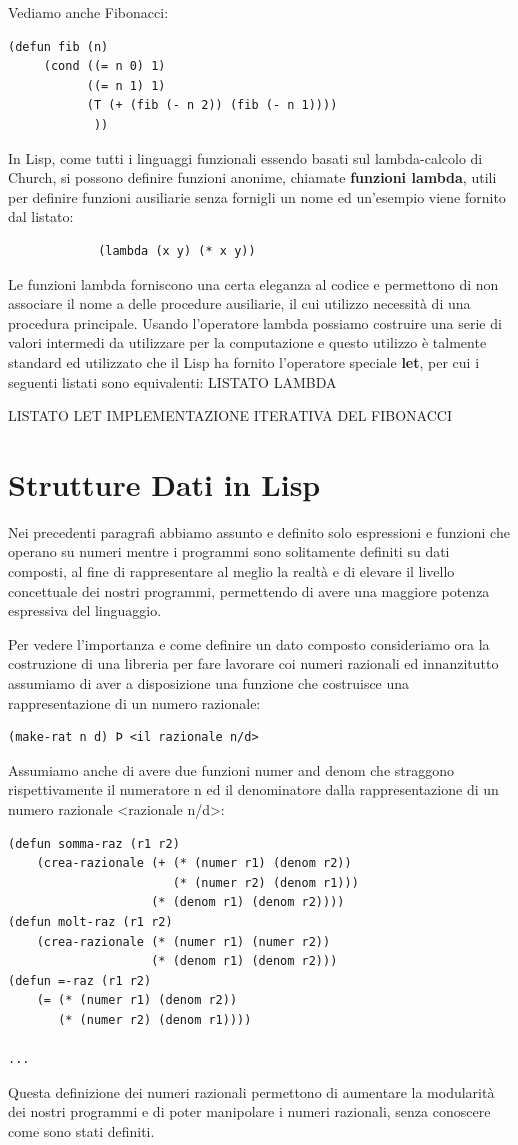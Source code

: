 \documentclass[a4paper]{book}
\begin{document}
Vediamo anche Fibonacci:
\begin{verbatim}
(defun fib (n)
     (cond ((= n 0) 1)
           ((= n 1) 1)
           (T (+ (fib (- n 2)) (fib (- n 1))))
            ))
\end{verbatim}
In Lisp, come tutti i linguaggi funzionali essendo basati sul lambda-calcolo di Church,
si possono definire funzioni anonime, chiamate \textbf{funzioni lambda}, utili per
definire funzioni ausiliarie senza fornigli un nome ed un'esempio viene fornito dal listato:
\begin{figure}
\begin{verbatim}
       (lambda (x y) (* x y))
\end{verbatim}
\end{figure}
Le funzioni lambda forniscono una certa eleganza al codice e permettono di non associare
il nome a delle procedure ausiliarie, il cui utilizzo necessità di una procedura principale.
Usando l'operatore lambda possiamo costruire una serie di valori intermedi da
utilizzare per la computazione e questo utilizzo è talmente standard ed utilizzato
che il Lisp ha fornito l'operatore speciale \textbf{let}, per cui i seguenti listati
sono equivalenti:
LISTATO LAMBDA

LISTATO LET
IMPLEMENTAZIONE ITERATIVA DEL FIBONACCI
\section{Strutture Dati in Lisp}
Nei precedenti paragrafi abbiamo assunto e definito solo espressioni e funzioni che operano su numeri mentre i programmi sono solitamente
definiti su dati composti, al fine di rappresentare al meglio la realtà e di elevare il livello concettuale dei nostri programmi, permettendo
di avere una maggiore potenza espressiva del linguaggio.

Per vedere l'importanza e come definire un dato composto consideriamo ora la costruzione di una libreria per fare lavorare coi numeri razionali
ed innanzitutto assumiamo di aver a disposizione una funzione che costruisce una rappresentazione di un numero razionale:
\begin{verbatim}
(make-rat n d) Þ <il razionale n/d>
\end{verbatim}
Assumiamo anche di avere due funzioni numer and denom che straggono rispettivamente il numeratore n ed il denominatore dalla
rappresentazione di un numero razionale <razionale n/d>:
\begin{verbatim}
(defun somma-raz (r1 r2)
    (crea-razionale (+ (* (numer r1) (denom r2))
                       (* (numer r2) (denom r1)))
                    (* (denom r1) (denom r2))))
(defun molt-raz (r1 r2)
    (crea-razionale (* (numer r1) (numer r2))
                    (* (denom r1) (denom r2)))
(defun =-raz (r1 r2)
    (= (* (numer r1) (denom r2))
       (* (numer r2) (denom r1))))

...
\end{verbatim}
Questa definizione dei numeri razionali permettono di aumentare la modularità dei nostri programmi e di poter manipolare i numeri razionali,
senza conoscere come sono stati definiti.
\end{document}

